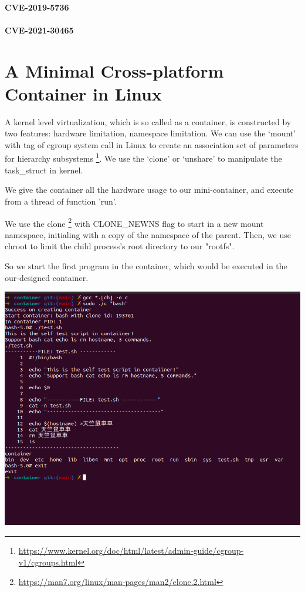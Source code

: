\paragraph{CVE-2019-5736}

\paragraph{CVE-2021-30465}

\section{A Minimal Cross-platform Container in Linux}
A kernel level virtualization, which is so called as a container, is constructed by two
features: hardware limitation, namespace limitation. We can use the `mount' with tag of
cgroup system call in Linux to create an association set of parameters for hierarchy
subsystems \footnote{\url{https://www.kernel.org/doc/html/latest/admin-guide/cgroup-v1/cgroups.html}}.
We use the `clone' or `unshare' to manipulate the task\_struct in kernel.

We give the container all the hardware usage to our mini-container, and execute from a thread of
function 'run'.

We use the clone \footnote{\url{https://man7.org/linux/man-pages/man2/clone.2.html}} with
CLONE\_NEWNS flag to start in a new mount namespace, initialing with a copy of the
namespace of the parent. Then, we use chroot to limit the child process's root directory
to our "rootfs".

So we start the first program in the container, which would be executed in the
our-designed container.

{
    \includegraphics[width=\textwidth]{src/cur_cont.png}
}

